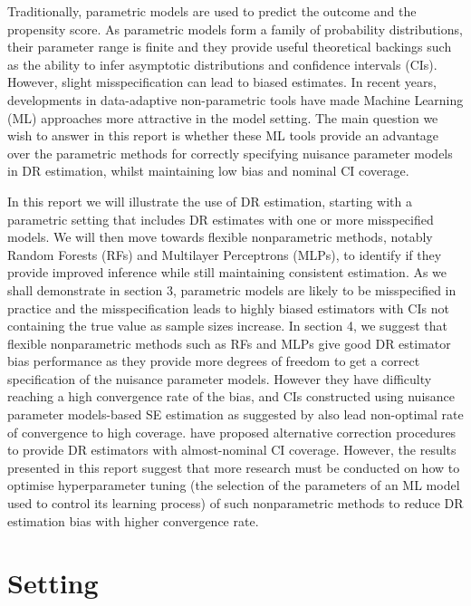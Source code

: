 \documentclass[12pt,twoside]{article}
\begin{document}
Traditionally, parametric models are used to predict the outcome and the propensity score. As parametric models form a family of probability distributions, their parameter range is finite and they provide useful theoretical backings such as the ability to infer asymptotic distributions and confidence intervals (CIs). However, slight misspecification can lead to biased estimates. In recent years, developments in data-adaptive non-parametric tools have made Machine Learning (ML) approaches more attractive in the model setting. The main question we wish to answer in this report is whether these ML tools provide an advantage over the parametric methods for correctly specifying nuisance parameter models in DR estimation, whilst maintaining low bias and nominal CI coverage.
 
In this report we will illustrate the use of DR estimation, starting with a parametric setting that includes DR estimates with one or more misspecified models. We will then move towards flexible nonparametric methods, notably Random Forests (RFs) and Multilayer Perceptrons (MLPs), to identify if they provide improved inference while still maintaining consistent estimation. As we shall demonstrate in section 3, parametric models are likely to be misspecified in practice and the misspecification leads to highly biased estimators with CIs not containing the true value as sample sizes increase. In section 4, we suggest that flexible nonparametric methods such as RFs and MLPs give good DR estimator bias performance as they provide more degrees of freedom to get a correct specification of the nuisance parameter models. However they have difficulty reaching a high convergence rate of the bias, and CIs constructed using nuisance parameter models-based SE estimation as suggested by \cite{davidian} also lead non-optimal rate of convergence to high coverage. \cite{benkeser2017} have proposed alternative correction procedures to provide DR estimators with almost-nominal CI coverage. However, the results presented in this report suggest that more research must be conducted on how to optimise hyperparameter tuning (the selection of the parameters of an ML model used to control its learning process) of such nonparametric methods to reduce DR estimation bias with higher convergence rate.


\section{Setting} 
\end{document}
